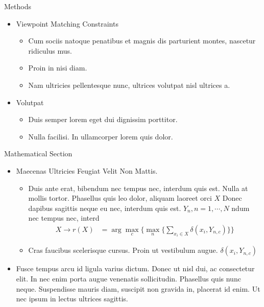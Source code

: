 \documentclass[final,hyperref={pdfpagelabels=false}]{beamer}
\begin{document}
\begin{frame}[t]
\begin{columns}[t]
\begin{column}{.465\textwidth}
\begin{block}{Methods}
\begin{itemize}
\item Viewpoint Matching Constraints
\begin{itemize}
\item Cum sociis natoque penatibus et magnis dis parturient montes, nascetur ridiculus mus. 
\item Proin in nisi diam.
\item Nam ultricies pellentesque nunc, ultrices volutpat nisl ultrices a.
\end{itemize}

\item Volutpat 
\begin{itemize}
\item Duis semper lorem eget dui dignissim porttitor.
\item Nulla facilisi. In ullamcorper lorem quis dolor.
\end{itemize}
\end{itemize}

\end{block}


\begin{block}{Mathematical Section}

\begin{itemize}
\item Maecenas Ultricies Feugiat Velit Non Mattis.
\begin{itemize}
\item Duis ante erat, bibendum nec tempus nec, interdum quis est. Nulla at mollis tortor. Phasellus quis leo dolor, aliquam laoreet orci $X$ Donec dapibus sagittis neque eu nec, interdum quis est. $Y_n, n=1,\cdots,N$ ndum nec tempus nec, interd
\begin{align*}
X \rightarrow r(X) & = \arg \max_{c} \Big\{ \max_n \big\{ \sum_{x_i \in X} \delta(x_i,Y_{n,c})\big\} \Big\} 
\end{align*}
\item Cras faucibus scelerisque cursus. Proin ut vestibulum augue. $\delta(x_i,Y_{n,c})$
\end{itemize}
\item Fusce tempus arcu id ligula varius dictum. Donec ut nisl dui, ac consectetur elit. In nec enim porta augue venenatis sollicitudin. Phasellus quis nunc neque. Suspendisse mauris diam, suscipit non gravida in, placerat id enim. Ut nec ipsum in lectus ultrices sagittis.
\end{itemize}


\end{block}
\end{column}
\end{columns}
\end{frame}
\end{document}
